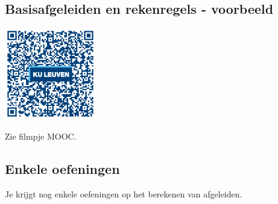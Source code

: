 \subsection{Basisafgeleiden en rekenregels - voorbeeld}
\begin{minipage}{.25\linewidth}
	\raggedright
	\includegraphics[width=4cm]{6_afgeleiden_integralen/inputs/QR_Code_BASISAFG_module6new}
\end{minipage}
\begin{minipage}{.7\linewidth}
	Zie filmpje MOOC.
\end{minipage}

\subsection{Enkele oefeningen}
Je krijgt nog enkele oefeningen op het berekenen van afgeleiden.

